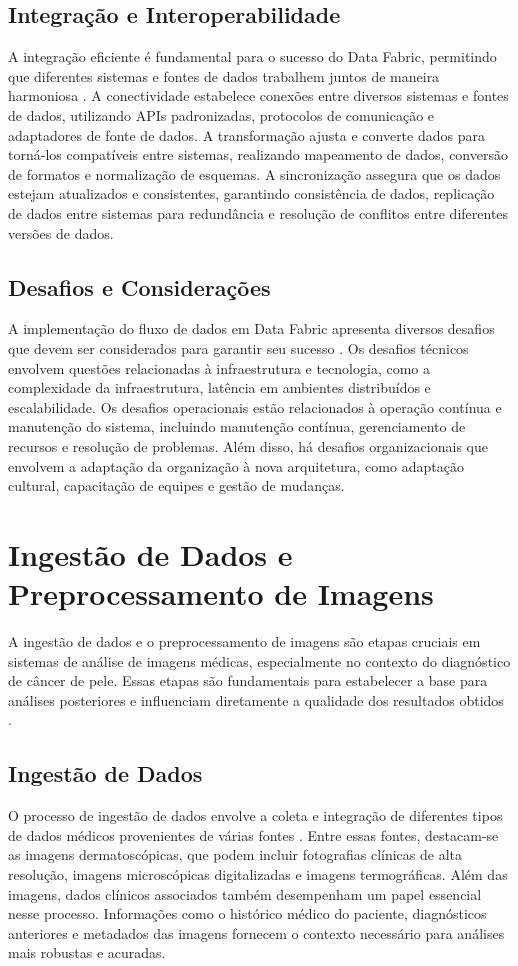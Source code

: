 \subsection{Integração e Interoperabilidade}
A integração eficiente é fundamental para o sucesso do Data Fabric, permitindo que diferentes sistemas e fontes de dados trabalhem juntos de maneira harmoniosa \cite{barik2022data}. A conectividade estabelece conexões entre diversos sistemas e fontes de dados, utilizando APIs padronizadas, protocolos de comunicação e adaptadores de fonte de dados. A transformação ajusta e converte dados para torná-los compatíveis entre sistemas, realizando mapeamento de dados, conversão de formatos e normalização de esquemas.
A sincronização assegura que os dados estejam atualizados e consistentes, garantindo consistência de dados, replicação de dados entre sistemas para redundância e resolução de conflitos entre diferentes versões de dados.
\subsection{Desafios e Considerações}
A implementação do fluxo de dados em Data Fabric apresenta diversos desafios que devem ser considerados para garantir seu sucesso \cite{addagada2022best}. Os desafios técnicos envolvem questões relacionadas à infraestrutura e tecnologia, como a complexidade da infraestrutura, latência em ambientes distribuídos e escalabilidade. Os desafios operacionais estão relacionados à operação contínua e manutenção do sistema, incluindo manutenção contínua, gerenciamento de recursos e resolução de problemas.
Além disso, há desafios organizacionais que envolvem a adaptação da organização à nova arquitetura, como adaptação cultural, capacitação de equipes e gestão de mudanças.


\section{Ingestão de Dados e Preprocessamento de Imagens}
A ingestão de dados e o preprocessamento de imagens são etapas cruciais em sistemas de análise de imagens médicas, especialmente no contexto do diagnóstico de câncer de pele. Essas etapas são fundamentais para estabelecer a base para análises posteriores e influenciam diretamente a qualidade dos resultados obtidos \cite{garcia2023medical}.
\subsection{Ingestão de Dados}
O processo de ingestão de dados envolve a coleta e integração de diferentes tipos de dados médicos provenientes de várias fontes \cite{kumar2023data}. Entre essas fontes, destacam-se as imagens dermatoscópicas, que podem incluir fotografias clínicas de alta resolução, imagens microscópicas digitalizadas e imagens termográficas. Além das imagens, dados clínicos associados também desempenham um papel essencial nesse processo. Informações como o histórico médico do paciente, diagnósticos anteriores e metadados das imagens fornecem o contexto necessário para análises mais robustas e acuradas.
